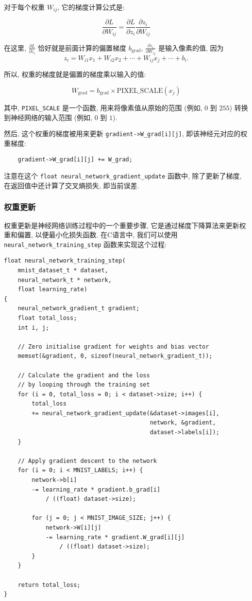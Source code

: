 \documentclass{ctexart}
\begin{document}
对于每个权重 $W_{ij}$, 它的梯度计算公式是:

$$
    \frac{\partial L}{\partial W_{ij}} = \frac{\partial L}{\partial z_i} \frac{\partial z_i}{\partial W_{ij}}
$$

在这里, $\frac{\partial L}{\partial z_i}$ 恰好就是前面计算的偏置梯度 $b_{\text{grad}}$,
$\frac{\partial z_i}{\partial W_{ij}}$ 是输入像素的值, 因为
$$
    z_i = W_{i1}x_1 + W_{i2}x_2 + \cdots + W_{ij}x_j + \cdots + b_i.
$$

所以, 权重的梯度就是偏置的梯度乘以输入的值:

$$
    W_{\text{grad}} = b_{\text{grad}} \times \text{PIXEL\_SCALE}(x_j)
$$

其中, \verb|PIXEL_SCALE| 是一个函数, 用来将像素值从原始的范围 (例如, $0$ 到 $255$) 转换到神经网络的输入范围 (例如, $0$ 到 $1$).

然后, 这个权重的梯度被用来更新 \verb|gradient->W_grad[i][j]|, 即该神经元对应的权重梯度:

\begin{verbatim}
    gradient->W_grad[i][j] += W_grad;    
\end{verbatim}

注意在这个 \verb|float neural_network_gradient_update| 函数中, 除了更新了梯度, 在返回值中还计算了交叉熵损失, 即当前误差.

\subsubsection{权重更新}

权重更新是神经网络训练过程中的一个重要步骤, 它是通过梯度下降算法来更新权重和偏置, 以便最小化损失函数.
在C语言中, 我们可以使用 \verb|neural_network_training_step| 函数来实现这个过程:

\begin{verbatim}  
float neural_network_training_step(
    mnist_dataset_t * dataset, 
    neural_network_t * network, 
    float learning_rate)  
{  
    neural_network_gradient_t gradient;  
    float total_loss;  
    int i, j;  
  
    // Zero initialise gradient for weights and bias vector  
    memset(&gradient, 0, sizeof(neural_network_gradient_t));  
  
    // Calculate the gradient and the loss 
    // by looping through the training set  
    for (i = 0, total_loss = 0; i < dataset->size; i++) {  
        total_loss 
        += neural_network_gradient_update(&dataset->images[i], 
                                          network, &gradient, 
                                          dataset->labels[i]);  
    }  
  
    // Apply gradient descent to the network  
    for (i = 0; i < MNIST_LABELS; i++) {  
        network->b[i] 
        -= learning_rate * gradient.b_grad[i] 
            / ((float) dataset->size);  
  
        for (j = 0; j < MNIST_IMAGE_SIZE; j++) {  
            network->W[i][j] 
            -= learning_rate * gradient.W_grad[i][j] 
                / ((float) dataset->size);  
        }  
    }  
  
    return total_loss;  
}  
\end{verbatim}
\end{document}
